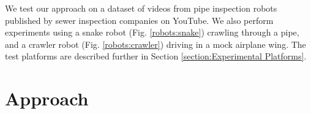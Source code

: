 \documentclass[letterpaper, 10 pt, conference]{ieeeconf}
\begin{document}

We test our approach on a dataset of videos from pipe inspection robots published by sewer inspection companies on YouTube. We also perform experiments using a snake robot (Fig. \ref{robots:snake}) crawling through a pipe, and a crawler robot (Fig. \ref{robots:crawler}) driving in a mock airplane wing. The test platforms are described further in Section \ref{section:Experimental Platforms}.


\section{Approach}
\end{document}
